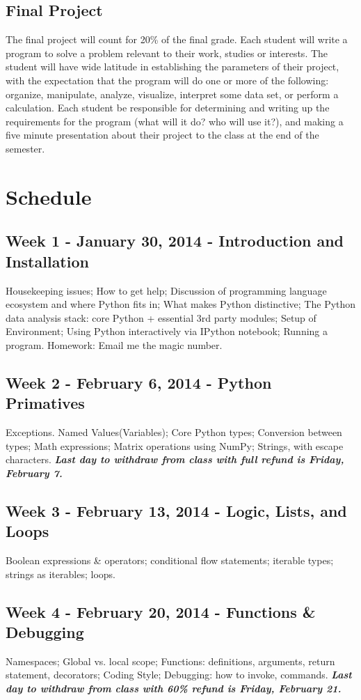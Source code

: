 \documentclass{article}
\begin{document}
\subsection{Final Project}
The final project will count for 20\% of the final grade. Each student will write a program to solve a problem relevant to their work, studies or interests. The student will have wide latitude in establishing the parameters of their project, with the expectation that the program will do one or more of the following: organize, manipulate, analyze, visualize, interpret some data set, or perform a calculation. Each student be responsible for determining and writing up the requirements for the program (what will it do? who will use it?), and making a five minute presentation about their project to the class at the end of the semester.
\section{Schedule}  
\subsection*{Week 1 - January 30, 2014 - Introduction and Installation}
Housekeeping issues; How to get help; Discussion of programming language ecosystem and where Python fits in; What makes Python distinctive; The Python data analysis stack: core Python + essential 3rd party modules; Setup of Environment; Using Python interactively via IPython notebook; Running a program. Homework: Email me the magic number.
\subsection*{Week 2 - February 6, 2014 - Python Primatives}
Exceptions. Named Values(Variables); Core Python types; Conversion between types; Math expressions; Matrix operations using NumPy; Strings, with escape characters. \textbf{\textit{Last day to withdraw from class with full refund is Friday, February 7.}}
\subsection*{Week 3 - February 13, 2014 - Logic, Lists, and Loops}
Boolean expressions \& operators; conditional flow statements; iterable types; strings as iterables; loops. 
\subsection*{Week 4 - February 20, 2014 - Functions \& Debugging}
Namespaces; Global vs. local scope; Functions: definitions, arguments, return statement, decorators;  Coding Style; Debugging: how to invoke, commands.  \textbf{\textit{Last day to withdraw from class with 60\% refund is Friday, February 21.}}
\end{document}
